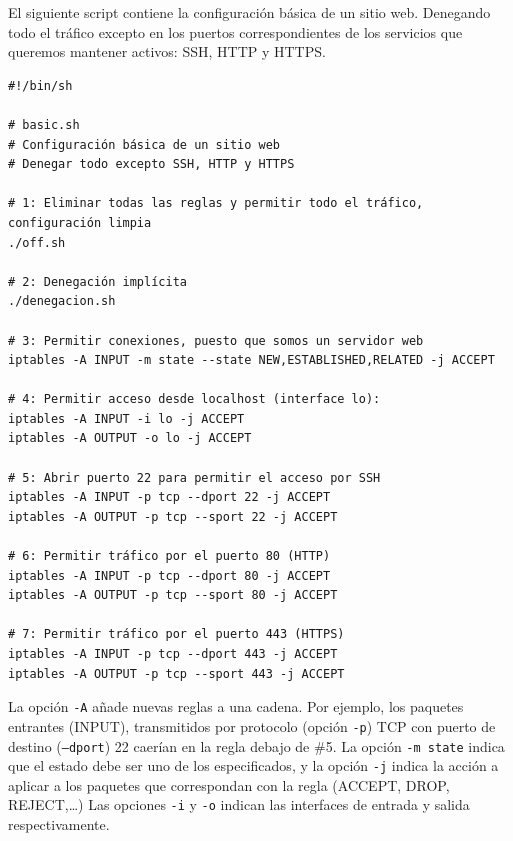 \documentclass{article}
\begin{document}
El siguiente script contiene la configuración básica de un sitio web. Denegando todo el tráfico
excepto en los puertos correspondientes de los servicios que queremos mantener activos: SSH, HTTP y HTTPS.

\begin{Verbatim}
#!/bin/sh

# basic.sh
# Configuración básica de un sitio web
# Denegar todo excepto SSH, HTTP y HTTPS

# 1: Eliminar todas las reglas y permitir todo el tráfico, configuración limpia
./off.sh

# 2: Denegación implícita
./denegacion.sh

# 3: Permitir conexiones, puesto que somos un servidor web
iptables -A INPUT -m state --state NEW,ESTABLISHED,RELATED -j ACCEPT

# 4: Permitir acceso desde localhost (interface lo):
iptables -A INPUT -i lo -j ACCEPT
iptables -A OUTPUT -o lo -j ACCEPT

# 5: Abrir puerto 22 para permitir el acceso por SSH
iptables -A INPUT -p tcp --dport 22 -j ACCEPT
iptables -A OUTPUT -p tcp --sport 22 -j ACCEPT

# 6: Permitir tráfico por el puerto 80 (HTTP)
iptables -A INPUT -p tcp --dport 80 -j ACCEPT
iptables -A OUTPUT -p tcp --sport 80 -j ACCEPT

# 7: Permitir tráfico por el puerto 443 (HTTPS)
iptables -A INPUT -p tcp --dport 443 -j ACCEPT
iptables -A OUTPUT -p tcp --sport 443 -j ACCEPT
\end{Verbatim}

La opción \texttt{-A} añade nuevas reglas a una cadena. Por ejemplo, los paquetes entrantes (INPUT), transmitidos
por protocolo (opción \texttt{-p}) TCP con puerto de destino (\texttt{--dport}) 22 caerían en la regla debajo de
\#5.
La opción \texttt{-m state} indica que el estado debe ser uno de los especificados,
y la opción \texttt{-j} indica la acción a aplicar a los paquetes que correspondan con la regla (ACCEPT, DROP, REJECT,\ldots)
Las opciones \texttt{-i} y \texttt{-o} indican las interfaces de entrada y salida respectivamente.
\end{document}
